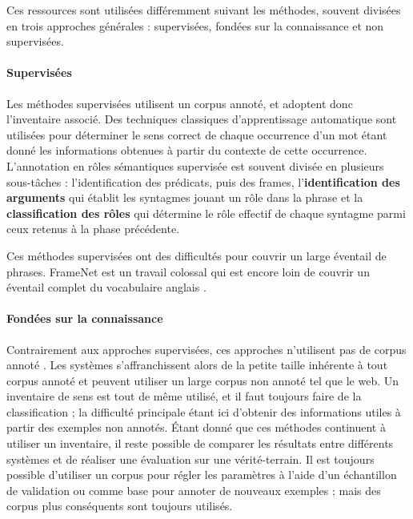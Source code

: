 Ces ressources sont utilisées différemment suivant les méthodes, souvent
divisées en trois approches générales : supervisées, fondées sur la
connaissance et non supervisées.

\paragraph{Supervisées}

Les méthodes supervisées
\citep{gildea2002automatic,surdeanu2008conll,das2014frame} utilisent un
corpus annoté, et adoptent donc l'inventaire associé. Des techniques classiques
d'apprentissage automatique sont utilisées pour déterminer le sens correct de
chaque occurrence d'un mot étant donné les informations obtenues à partir du
contexte de cette occurrence.  L'annotation en rôles sémantiques supervisée est
souvent divisée en plusieurs sous-tâches : l'identification des prédicats, puis
des frames, l'\textbf{identification des arguments} qui établit les syntagmes
jouant un rôle dans la phrase et la \textbf{classification des rôles} qui
détermine le rôle effectif de chaque syntagme parmi ceux retenus à la phase
précédente.

Ces méthodes supervisées ont des difficultés pour couvrir un large éventail de
phrases. FrameNet est un travail colossal qui est encore loin de couvrir un
éventail complet du vocabulaire anglais \citep[p.~155]{marquez2008semantic}.

\paragraph{Fondées sur la connaissance}

Contrairement aux approches supervisées, ces approches n'utilisent pas de
corpus annoté \citep{swier2005exploiting,pradet2013revisiting}. Les systèmes
s'affranchissent alors de la petite taille inhérente à tout corpus annoté et
peuvent utiliser un large corpus non annoté tel que le web. Un inventaire de
sens est tout de même utilisé, et il faut toujours faire de la classification ;
la difficulté principale étant ici d'obtenir des informations utiles à partir
des exemples non annotés. Étant donné que ces méthodes continuent à utiliser un
inventaire, il reste possible de comparer les résultats entre différents
systèmes et de réaliser une évaluation sur une vérité-terrain. Il est toujours
possible d'utiliser un corpus pour régler les paramètres à l'aide d'un
échantillon de validation ou comme base pour annoter de nouveaux exemples ;
mais des corpus plus conséquents sont toujours utilisés.

